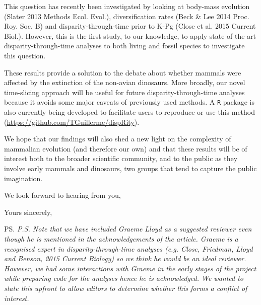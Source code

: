 \documentclass[11pt]{letter}
\begin{document}
\begin{letter}{}
This question has recently been investigated by looking at body-mass evolution (Slater 2013 Methods Ecol. Evol.), diversification rates (Beck \& Lee 2014 Proc. Roy. Soc. B) and disparity-through-time prior to K-Pg (Close et al. 2015 Current Biol.).
However, this is the first study, to our knowledge, to apply state-of-the-art disparity-through-time analyses to both living and fossil species to investigate this question.

These results provide a solution to the debate about whether mammals were affected by the extinction of the non-avian dinosaurs.
More broadly, our novel time-slicing approach will be useful for future disparity-through-time analyses because it avoids some major caveats of previously used methods.
A \texttt{R} package is also currently being developed to facilitate users to reproduce or use this method (\url{https://github.com/TGuillerme/dispRity}).

We hope that our findings will also shed a new light on the complexity of mammalian evolution (and therefore our own) and that these results will be of interest both to the broader scientific community, and to the public as they involve early mammals and dinosaurs, two groups that tend to capture the public imagination.



We look forward to hearing from you,

\closing{Yours sincerely,}

\ps{\textit{P.S. Note that we have included Graeme Lloyd as a suggested reviewer even though he is mentioned in the acknowledgements of the article.
Graeme is a recognised expert in disparity-through-time analyses (e.g. Close, Friedman, Lloyd and Benson, 2015 Current Biology) so we think he would be an ideal reviewer.
However, we had some interactions with Graeme in the early stages of the project while preparing code for the analyses hence he is acknowledged.
We wanted to state this upfront to allow editors to determine whether this forms a conflict of interest.}}

\end{letter}
\end{document}
